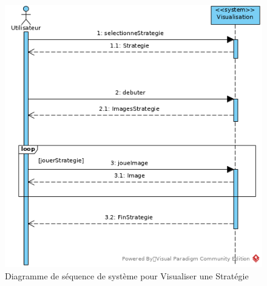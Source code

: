 \begin{figure}[htpb]
    \centering
    \includegraphics[scale=0.5]{fig/ssd_visualiser_strategie.png}
    \caption{Diagramme de séquence de système pour Visualiser une Stratégie}
    \label{fig:ssd_visualiser_strategie}
\end{figure}
